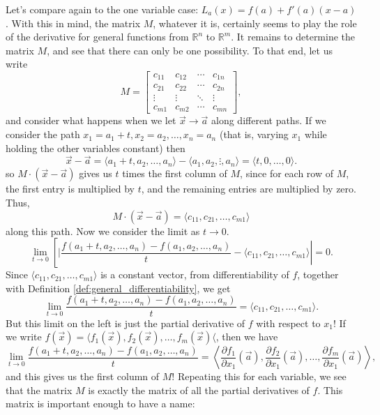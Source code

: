 Let's compare again to the one variable case: $L_a(x)=f(a)+f'(a)(x-a)$. With this in mind, the matrix $M$, whatever it is, certainly seems to play the role of the derivative for general functions from $\mathbb{R}^n$ to $\mathbb{R}^m$. It remains to determine the matrix $M$, and see that there can only be one possibility. To that end, let us write
\[
M = \begin{bmatrix}
c_{11} & c_{12} & \cdots & c_{1n}\\
c_{21} & c_{22} & \cdots & c_{2n}\\
\vdots & \vdots & \ddots & \vdots\\
c_{m1} & c_{m2} & \cdots & c_{mn}\end{bmatrix},
\]
and consider what happens when we let $\vec{x}\to\vec{a}$ along different paths. If we consider the path $x_1 = a_1+t, x_2=a_2, \ldots, x_n=a_n$ (that is, varying $x_1$ while holding the other variables constant) then
\[
 \vec{x} - \vec{a} = \langle a_1+t,a_2,\ldots, a_n\rangle - \langle a_1,a_2,\vdots ,a_n\rangle = \langle t, 0, \ldots, 0\rangle.
\]
so $M\cdot (\vec{x}-\vec{a})$ gives us $t$ times the first column of $M$, since for each row of $M$, the first entry is multiplied by $t$, and the remaining entries are multiplied by zero. Thus, 
\[
M\cdot (\vec{x}-\vec{a}) = \langle c_{11}, c_{21}, \ldots, c_{m1}\rangle
\]
along this path. Now we consider the limit as $t\to 0$. 
\[
 \lim_{t\to 0}\left[\lvert\frac{f(a_1+t,a_2,\ldots, a_n)-f(a_1,a_2,\ldots, a_n)}{t} - \langle c_{11}, c_{21}, \ldots, c_{m1}\rangle\right\rvert = 0. 
\]
Since $\langle c_{11}, c_{21}, \ldots, c_{m1}\rangle$ is a constant vector, from differentiability of $f$, together with Definition \ref{def:general_differentiability}, we get
\[
\lim_{t\to 0}\frac{f(a_1+t,a_2,\ldots, a_n)-f(a_1,a_2,\ldots, a_n)}{t} = \langle c_{11}, c_{21}, \ldots, c_{m1}\rangle.
\]
But this limit on the left is just the partial derivative of $f$ with respect to $x_1$!
If we write $f(\vec{x}) = \langle f_1(\vec{x}),f_2(\vec{x}),\ldots, f_m(\vec{x})\langle$, then we have
\[
 \lim_{t\to 0}\frac{f(a_1+t,a_2,\ldots, a_n)-f(a_1,a_2,\ldots, a_n)}{t} = \left\langle\frac{\partial f_1}{\partial x_1}(\vec{a}), \frac{\partial f_2}{\partial x_1}(\vec{a}), \ldots, \frac{\partial f_m}{\partial x_1}(\vec{a})\right\rangle,
\]
and this gives us the first column of $M$! Repeating this for each variable, we see that the matrix $M$ is exactly the matrix of all the partial derivatives of $f$. This matrix is important enough to have a name:

